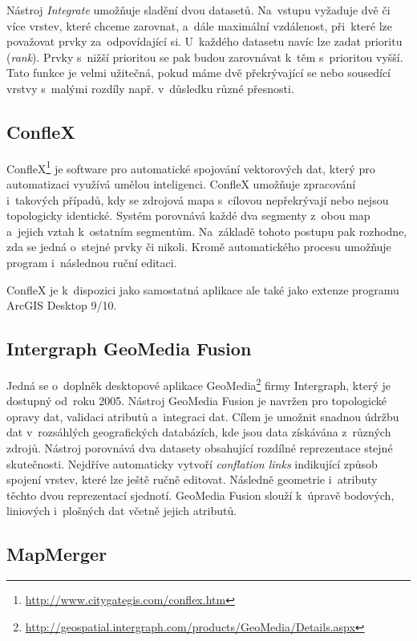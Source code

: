Nástroj \textit{Integrate} umožňuje sladění dvou datasetů. Na~vstupu vyžaduje 
dvě či více vrstev, které chceme zarovnat, a~dále maximální vzdálenost, při~které
lze považovat prvky za~odpo\-vídající si. U~každého datasetu navíc lze zadat 
prioritu (\textit{rank}). Prvky s~nižší prioritou se pak budou zarovnávat 
k~těm s~prioritou vyšší. Tato funkce je velmi užitečná, pokud máme dvě 
překrývající se nebo sousedící vrstvy s~malými rozdíly např. v~důsledku různé
přesnosti.


\subsection{ConfleX}
\label{conflex}

ConfleX\footnote{\url{http://www.citygategis.com/conflex.htm}} 
je software pro automatické spojování vektorových  dat,
který pro automatizaci využívá umělou inteligenci. ConfleX umožňuje zpracování 
i~takových případů, kdy se zdrojová mapa s~cílovou nepřekrývají nebo nejsou 
topologicky identické. Systém porovnává každé dva segmenty z~obou map a~jejich
vztah k~ostatním segmentům. Na~základě tohoto postupu pak rozhodne, zda se 
jedná o~stejné prvky či nikoli. Kromě automatického procesu umožňuje program 
i~následnou ruční editaci.

ConfleX je k~dispozici jako samostatná aplikace ale také jako extenze 
programu ArcGIS Desktop 9/10.


\subsection{Intergraph GeoMedia Fusion}
\label{geomedia}

Jedná se o~doplněk desktopové aplikace 
GeoMedia\footnote{\url{http://geospatial.intergraph.com/products/GeoMedia/Details.aspx}}
firmy Intergraph, který je dostupný od~roku 2005. Nástroj GeoMedia Fusion  
je navržen pro topologické opravy dat, validaci atributů a~integraci dat. Cílem 
je umožnit snadnou údržbu dat v~rozsáhlých geografických databázích, kde jsou 
data získávána z~různých zdrojů. Nástroj porovnává dva datasety obsahující 
rozdílné reprezentace stejné skutečnosti. Nejdříve automaticky vytvoří 
\textit{conflation links} indikující způsob spojení vrstev, které lze ještě
ručně editovat. Následně geometrie i~atributy těchto dvou reprezentací
sjednotí. GeoMedia Fusion slouží k~úpravě bodových, liniových i~plošných dat
včetně jejich atributů. 


\subsection{MapMerger}
\label{mapmerger}

